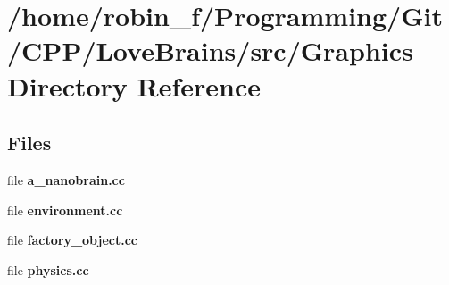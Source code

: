 \section{/home/robin\+\_\+f/\+Programming/\+Git/\+C\+P\+P/\+Love\+Brains/src/\+Graphics Directory Reference}
\label{dir_2328c974987f0ce10b5cdfc391bd9201}
\subsection*{Files}
\begin{DoxyCompactItemize}
\item 
file {\bfseries a\+\_\+nanobrain.\+cc}
\item 
file {\bfseries environment.\+cc}
\item 
file {\bfseries factory\+\_\+object.\+cc}
\item 
file {\bfseries physics.\+cc}
\end{DoxyCompactItemize}
